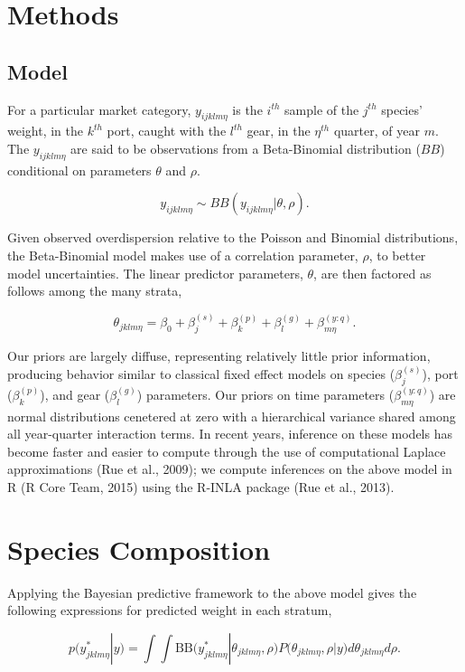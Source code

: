 \section{Methods}\label{methods}

\subsection{Model}\label{model}

For a particular market category, \(y_{ijklm\eta}\) is the \(i^{th}\)
sample of the \(j^{th}\) species' weight, in the \(k^{th}\) port, caught
with the \(l^{th}\) gear, in the \(\eta^{th}\) quarter, of year \(m\).
The \(y_{ijklm\eta}\) are said to be observations from a Beta-Binomial
distribution (\(BB\)) conditional on parameters \(\theta\) and \(\rho\).

\[y_{ijklm\eta} \sim BB(y_{ijklm\eta}|\theta, \rho).\]

Given observed overdispersion relative to the Poisson and Binomial
distributions, the Beta-Binomial model makes use of a correlation
parameter, \(\rho\), to better model uncertainties. The linear predictor
parameters, \(\theta\), are then factored as follows among the many
strata,

\[\theta_{jklm\eta} = \beta_0 + \beta^{(s)}_j + \beta^{(p)}_k + \beta^{(g)}_l + \beta^{(y:q)}_{m\eta}.\]

Our priors are largely diffuse, representing relatively little prior
information, producing behavior similar to classical fixed effect models
on species (\(\beta^{(s)}_{j}\)), port (\(\beta^{(p)}_{k}\)), and gear
(\(\beta^{(g)}_{l}\)) parameters. Our priors on time parameters
(\(\beta^{(y:q)}_{m\eta}\)) are normal distributions cenetered at zero
with a hierarchical variance shared among all year-quarter interaction
terms. In recent years, inference on these models has become faster and
easier to compute through the use of computational Laplace
approximations (Rue et al., 2009); we compute inferences on the above
model in R (R Core Team, 2015) using the R-INLA package (Rue et al.,
2013).

\section{Species Composition}\label{species-composition}

Applying the Bayesian predictive framework to the above model gives the
following expressions for predicted weight in each stratum,

\[p(y^*_{jklm\eta}|y) = \int\!\!\!\!\int\! \text{BB}\Big( y^*_{jklm\eta}|\theta_{jklm\eta}, \rho \Big) P\Big(\theta_{jklm\eta}, \rho | y\Big) d\theta_{jklm\eta} d\rho.\]

